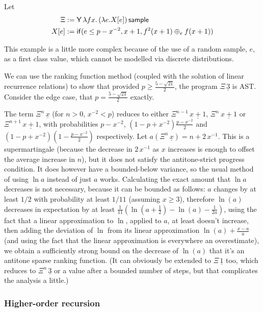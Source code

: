 \begin{example}
\label{ex:non-affine continuous}
Let
\begin{align*}
\Xi & := \mathsf{Y}\, \lambda f x.\, (\lambda e. X[e]) \, \mathsf{sample} \\
X[e] & := \mathsf{if}(e \leq p - x^{-2}, x+1, f^2(x+1) \oplus_e f(x+1))
\end{align*}

This example is a little more complex because of the use of a random sample, $e$, as a first class value, which cannot be modelled via discrete distributions. 

We can use the ranking function method (coupled with the solution of linear recurrence relations) to show that provided $p \geq \frac{5 - \sqrt{21}}{2}$, the program $\Xi \, \underline 3$ is AST. 
Consider the edge case, that $p = \frac{5 - \sqrt{21}}{2}$ exactly.

The term $\Xi^n\, \underline x$ (for $n > 0$, $x^{-2} < p$) reduces to either $\Xi^{n-1}\, \underline{x+1}$, $\Xi^n\ \underline{x+1}$ or $\Xi^{n+1}\, \underline{x+1}$, 
with probabilities $p-x^{-2}$, $(1-p+x^{-2})\frac{p-x^{-2}}{2}$ and $(1-p+x^{-2})(1-\frac{p-x^{-2}}{2})$ respectively. 
Let $a(\Xi^n\, \underline x) = n + 2 \, x^{-1}$. 
This is a supermartingale (because the decrease in $2 \, x^{-1}$ as $x$ increases is enough to offset the average increase in $n$), but it does not satisfy the antitone-strict progress condition. 
It does however have a bounded-below variance, so the usual method of using $\ln a$ instead of just $a$ works. 
Calculating the exact amount that $\ln a$ decreases is not necessary, because it can be bounded as follows: 
$a$ changes by at least $1/2$ with probability at least $1/11$ (assuming $x \geq 3$), 
therefore $\ln(a)$ decreases in expectation by at least $\frac{1}{11}(\ln(a+\frac{1}{2}) - \ln(a) -\frac 1 {2a})$, 
using the fact that a linear approximation to $\ln$, applied to $a$, at least doesn't increase, 
then adding the deviation of $\ln$ from its linear approximation $\ln(a) + \frac{x-a}{a}$ 
(and using the fact that the linear approximation is everywhere an overestimate), 
we obtain a sufficiently strong bound on the decrease of $\ln(a)$ that it's an antitone sparse ranking function. 
(It can obviously be extended to $\Xi\, \underline 1$ too, which reduces to $\Xi^n\, \underline 3$ or a value after a bounded number of steps, but that complicates the analysis a little.)
\end{example}

\subsubsection*{Higher-order recursion}

